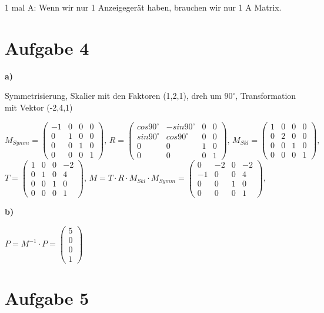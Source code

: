 \documentclass[fleqn]{article}
\begin{document}
1 mal A: Wenn wir nur 1 Anzeigegerät haben, brauchen wir nur 1 A Matrix.

\section{Aufgabe 4}

\noindent\textbf{a)}

Symmetrisierung, Skalier mit den Faktoren (1,2,1),  dreh um $90^\circ$, Transformation mit Vektor (-2,4,1)

$M_{Symm}=\begin{pmatrix}
    -1&0&0&0\\
    0&1&0&0\\
    0&0&1&0\\
    0&0&0&1
\end{pmatrix},\,
R=\begin{pmatrix}
    cos90^\circ&-sin90^\circ&0&0\\
    sin90^\circ&cos90^\circ&0&0\\
    0&0&1&0\\
    0&0&0&1
\end{pmatrix},\,
M_{Skl}=\begin{pmatrix}
    1&0&0&0\\
    0&2&0&0\\
    0&0&1&0\\
    0&0&0&1
\end{pmatrix},\,$ $
T=\begin{pmatrix}
    1&0&0&-2\\
    0&1&0&4\\
    0&0&1&0\\
    0&0&0&1
\end{pmatrix},\,
M=T\cdot R\cdot M_{Skl}\cdot M_{Symm}=\begin{pmatrix}
    0&-2&0&-2\\
    -1&0&0&4\\
    0&0&1&0\\
    0&0&0&1
\end{pmatrix},\,$

\noindent\textbf{b)}

$P=M^{-1}\cdot P=\begin{pmatrix}
    5\\0\\0\\1
\end{pmatrix}$

\section{Aufgabe 5}
\end{document}
